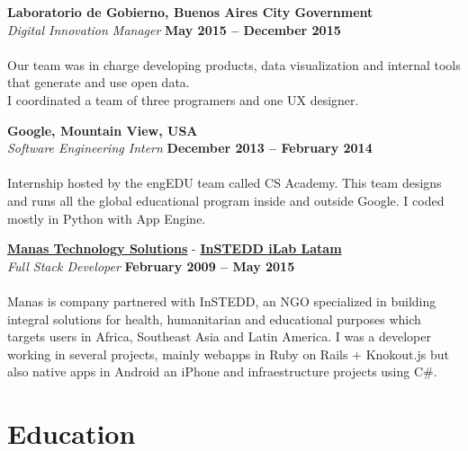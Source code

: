 \documentclass[margin,line]{resume}
\begin{document}
\begin{resume}
\textbf{Laboratorio de Gobierno, Buenos Aires City Government}\vspace{2mm}\\\vspace{1mm}
\textsl{Digital Innovation Manager} \hfill \textbf{May 2015 -- December 2015}\vspace{-3mm}\\\vspace{-1mm}
\\
Our team was in charge developing products, data visualization and internal tools that generate and use open data.
\\
I coordinated a team of three programers and one UX designer. 


\textbf{Google, Mountain View, USA}\vspace{2mm}\\\vspace{1mm}
\textsl{Software Engineering Intern} \hfill \textbf{December 2013 -- February 2014}\vspace{-3mm}\\\vspace{-1mm}
\\
Internship hosted by the engEDU team called CS Academy. This team designs and runs all the global educational program inside and outside Google. I coded mostly in Python with App Engine.

\textbf{\href{http://www.manas.com.ar/}{Manas Technology Solutions}} - 
\textbf{\href{http://www.instedd.org/}{InSTEDD iLab Latam}}\vspace{2mm}\\\vspace{1mm}
\textsl{Full Stack Developer} \hfill \textbf{February 2009 -- May 2015}\vspace{-3mm}\\\vspace{-1mm}
\\
Manas is company partnered with InSTEDD, an NGO specialized in building integral solutions for health, humanitarian and educational purposes which targets users in Africa, Southeast Asia and Latin America.  I was a developer working in several projects, mainly webapps in Ruby on Rails + Knokout.js but also native apps in Android an iPhone and infraestructure projects using C\#.

\section{\mysidestyle Education}


\end{resume}
\end{document}
